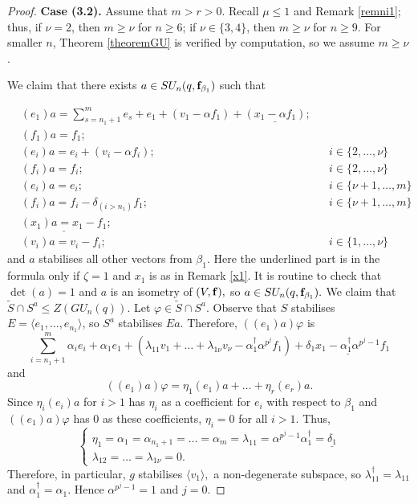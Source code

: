 \begin{proof}
\medskip

{\bf Case (3.2).} Assume that $m>r>0$. Recall $\mu \le 1$ and Remark \ref{remni1}; thus, if $\nu=2$, then $m \ge \nu$ for $n \ge 6$; if $\nu \in \{3,4\}$, then $m \ge \nu$ for $n \ge 9$.       For smaller $n$, Theorem \ref{theoremGU} is verified by computation, so we assume $m \ge \nu$.
    
We claim that there exists  $a \in SU_n(q, {\bf f}_{\beta_1})$ such that 

\begin{equation*}%
\begin{aligned}
&(e_1)a =\sum_{s=n_1+1}^m e_s +e_1 + (v_1 - \alpha f_{1}) + \underline{(x_1 -\alpha f_1)} ; \\ & (f_{1})a=f_{1}; & &  \\
&(e_i)a = e_i + (v_i - \alpha f_i); & &  i\in \{2, \ldots,  \nu \}  \\  & (f_{i})a=f_{i}; & &  i\in \{2, \ldots,  \nu \}  \\
&(e_i)a =e_i; & &  i\in \{\nu+1, \ldots, m \}  \\    & (f_{i})a=f_{i} -\delta_{(i>n_1)} f_1 ; & &  i\in \{\nu+1, \ldots, m \}  \\
&\underline{(x_1)a=x_1-f_{1}};\\ & (v_i)a= v_i-f_{i};&& i\in \{1, \ldots, \nu \}  
\end{aligned}
\end{equation*}
and $a$ stabilises all other vectors from $\beta_1.$ Here the underlined part is  in the formula only if ${\zeta}=1$ and $x_1$ is as in Remark \ref{x1}.  It is routine to check that $\det(a)=1$ and $a$ is an isometry of $(V, {\bf f}),$ so $a \in SU_n(q,{\bf f}_{\beta_1}).$
We claim that $\tilde{S} \cap S^a \le Z(GU_n(q)).$ Let $\varphi \in \tilde{S} \cap S^a$.
 Observe that $S$ stabilises  $E=\langle e_1, \ldots, e_{n_1} \rangle$, so $S^a$ stabilises $Ea.$ Therefore,  $((e_1)a)\varphi$ is
\begin{equation*}%
\sum_{i=n_1+1}^m\alpha_i e_i +\alpha_1 e_1 +(\lambda_{11} v_1 +\ldots + \lambda_{1 \nu} v_{\nu} -\alpha_1^{\dagger} \alpha^{p^j} f_1)+ \underline{\delta_1 x_1 -\alpha_1^{\dagger} \alpha^{p^j-1} f_1} 
\end{equation*}
and
$$((e_1)a)\varphi=\eta_1 (e_1)a+ \ldots +\eta_r(e_r)a.$$
Since $\eta_i(e_i)a$ for $i>1$ has $\eta_i$ as a coefficient for $e_i$ with respect to $\beta_1$ and $((e_1)a)\varphi$ has $0$ as these coefficients, $\eta_i=0$ for all $i>1.$  Thus, 
\begin{equation*}%
\begin{cases}
\eta_1=\alpha_1=  \alpha_{n_1+1}=\ldots=\alpha_m=\lambda_{11}=\alpha^{p^j-1}\alpha_1^{\dagger}= \underline{\delta_1}\\
\lambda_{12} = \ldots = \lambda_{1 \nu}=0.
\end{cases}
\end{equation*}
Therefore, in particular, $g$ stabilises $\langle v_1 \rangle,$ a non-degenerate subspace, so $\lambda_{11}^{\dagger}=\lambda_{11}$ and $\alpha_1^{\dagger}=\alpha_1$. Hence $\alpha^{p^j-1}=1$ and $j=0.$





\end{proof}

